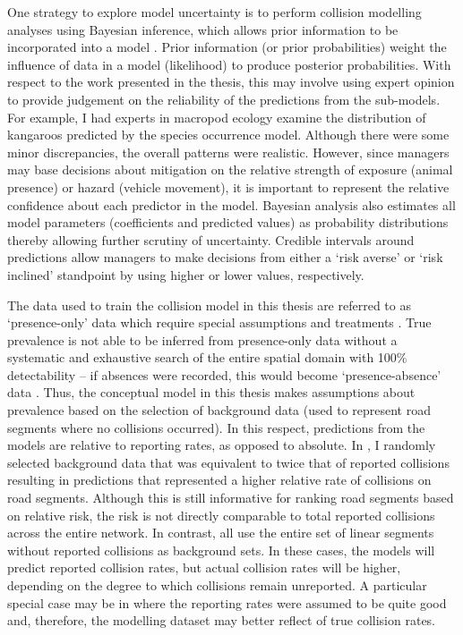 One strategy to explore model uncertainty is to perform collision modelling analyses using Bayesian inference, which allows prior information to be incorporated into a model \citep{mcca07}. Prior information (or prior probabilities) weight the influence of data in a model (likelihood) to produce posterior probabilities. With respect to the work presented in the thesis, this may involve using expert opinion to provide judgement on the reliability of the predictions from the sub-models. For example, I had experts in macropod ecology examine the distribution of kangaroos predicted by the species occurrence model. Although there were some minor discrepancies, the overall patterns were realistic. However, since managers may base decisions about mitigation on the relative strength of exposure (animal presence) or hazard (vehicle movement), it is important to represent the relative confidence about each predictor in the model. Bayesian analysis also estimates all model parameters (coefficients and predicted values) as probability distributions thereby allowing further scrutiny of uncertainty. Credible intervals around predictions allow managers to make decisions from either a `risk averse' or `risk inclined' standpoint by using higher or lower values, respectively. 

The data used to train the collision model in this thesis are referred to as `presence-only' data which require special assumptions and treatments \citep{wart13}. True prevalence is not able to be inferred from presence-only data without a systematic and exhaustive search of the entire spatial domain with 100\% detectability -- if absences were recorded, this would become `presence-absence' data \citep[see][]{hast13}. Thus, the conceptual model in this thesis makes assumptions about prevalence based on the selection of background data (used to represent road segments where no collisions occurred). In this respect, predictions from the models are relative to reporting rates, as opposed to absolute.  In , I randomly selected background data that was equivalent to twice that of reported collisions resulting in predictions that represented a higher relative rate of collisions on road segments. Although this is still informative for ranking road segments based on relative risk, the risk is not directly comparable to total reported collisions across the entire network. In contrast,  all use the entire set of linear segments without reported collisions as background sets. In these cases, the models will predict reported collision rates, but actual collision rates will be higher, depending on the degree to which collisions remain unreported. A particular special case may be in  where the reporting rates were assumed to be quite good and, therefore, the modelling dataset may better reflect of true collision rates.

